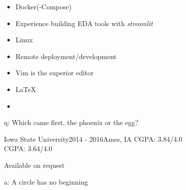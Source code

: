 \documentclass[10pt,a4paper,ragged2e,withhyper]{altacv}
\begin{document}
\begin{paracol}{2}

\begin{itemize}
\item Docker(-Compose)
\end{itemize}

\begin{itemize}
\item Experience building EDA tools with \textit{streamlit}
\end{itemize}

\begin{itemize}
\item {\faLinux} Linux 
\item Remote deployment/development
\item Vim is the superior editor
\item \LaTeX
\item  {\faGit}
\end{itemize}

\divider

\vspace*{\fill}
\hspace*{\fill}
q: Which came first, the phoenix or the egg?

\newpage

\medskip

 {Iowa State University}{2014 - 2016}{Ames, IA} 
\textsc{CGPA}: 3.84/4.0
\\
\textsc{CGPA}: 3.64/4.0




Available on request




\end{paracol}


\vspace*{\fill}
\hspace*{\fill}
a: A circle has no beginning

\clearpage
\end{document}
